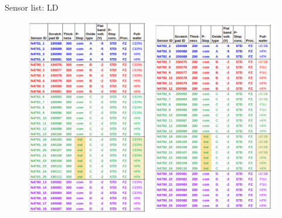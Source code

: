 \documentclass{beamer}
\begin{document}
\begin{frame}{Sensor list: LD}
   \begin{figure}
       \includegraphics[width=.8\textwidth]{plots/Fall_2021_sensorList.png}
   \end{figure} 
\end{frame}
\end{document}
